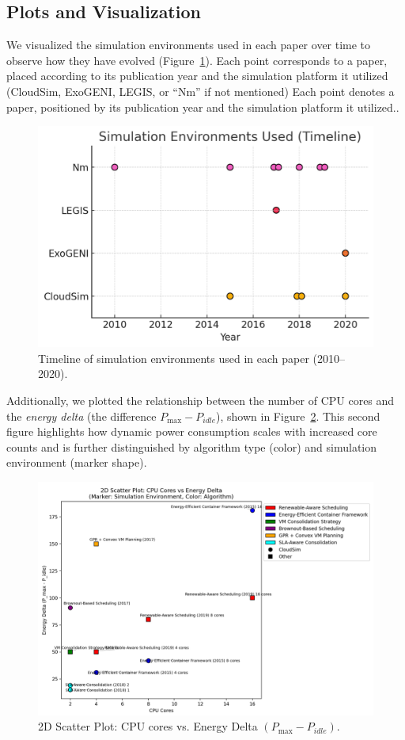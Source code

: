 \begin{multicols}{2}

\subsection{Plots and Visualization}
We visualized the simulation environments used in each paper over time to observe how they have evolved (Figure~\ref{fig:timeline}). Each point corresponds to a paper, placed according to its publication year and the simulation platform it utilized (CloudSim, ExoGENI, LEGIS, or ``Nm'' if not mentioned) Each point denotes a paper, positioned by its publication year and the simulation platform it utilized.. 


\begin{figure}[H]
    \centering
    \includegraphics[width=0.9\columnwidth]{sections/Timeline.png}
    \caption{Timeline of simulation environments used in each paper (2010--2020). }
    \label{fig:timeline}
\end{figure}

Additionally, we plotted the relationship between the number of CPU cores and the \textit{energy delta} (the difference $P_{\max} - P_{\textit{idle}}$), shown in Figure~\ref{fig:energy_delta}. This second figure highlights how dynamic power consumption scales with increased core counts and is further distinguished by algorithm type (color) and simulation environment (marker shape).

\end{multicols}
\begin{figure}[H]
    \centering
    \includegraphics[width=0.9\columnwidth]{sections/Energy.png}
    \caption{2D Scatter Plot: CPU cores vs. Energy Delta $(P_{\max} - P_{\textit{idle}})$.}
    \label{fig:energy_delta}
\end{figure}
\begin{multicols}{2}

\end{multicols}
